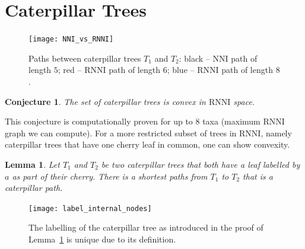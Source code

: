 \documentclass[11pt, a4paper]{article}
\newcommand{\nni}{\mathrm{NNI}}
\newcommand{\rnni}{\mathrm{RNNI}}
\newtheorem{conjecture}[definition]{Conjecture}
\newtheorem{lemma}[definition]{Lemma}
\begin{document}



\section{Caterpillar Trees}

\begin{figure}[H]
	\centering
	\texttt{[image: NNI\_vs\_RNNI]}
	\caption{Paths between caterpillar trees $T_1$ and $T_2$: black -- $\nni$ path of length $5$; red -- $\rnni$ path of length $6$; blue -- $\rnni$ path of length $8$.}
	\label{NNI_vs_RNNI}
\end{figure}

\begin{conjecture}
	The set of caterpillar trees is convex in $\rnni$ space.
\end{conjecture}

This conjecture is computationally proven for up to $8$ taxa (maximum $\rnni$ graph we can compute).
For a more restricted subset of trees in $\rnni$, namely caterpillar trees that have one cherry leaf in common, one can show convexity.

\begin{lemma}
	Let $T_1$ and $T_2$ be two caterpillar trees that both have a leaf labelled by $a$ as part of their cherry.
	There is a shortest paths from $T_1$ to $T_2$ that is a caterpillar path.
	\label{lemma:caterpillar_subset_convex}
\end{lemma}

\begin{figure}[h]
	\centering
	\texttt{[image: label\_internal\_nodes]}
	\caption{The labelling of the caterpillar tree as introduced in the proof of Lemma~\ref{lemma:caterpillar_subset_convex} is unique due to its definition.
	}
	\label{label_internal_nodes}
\end{figure}
\end{document}
